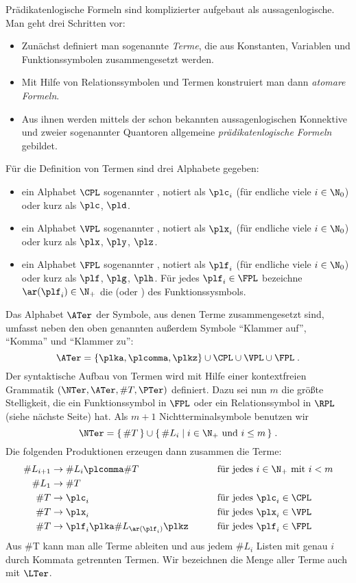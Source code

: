 Prädikatenlogische Formeln sind komplizierter aufgebaut als aussagenlogische.
%
Man geht drei Schritten vor:
%
\begin{itemize}
\item Zunächst definiert man sogenannte \emph{Terme}, die aus
  Konstanten, Variablen und Funktionssymbolen zusammengesetzt werden.
\item Mit Hilfe von Relationssymbolen und Termen konstruiert man dann
  \emph{atomare Formeln}.
\item Aus ihnen werden mittels der schon bekannten aussagenlogischen
  Konnektive und zweier sogenannter Quantoren allgemeine
  \emph{prädikatenlogische Formeln} gebildet.
\end{itemize}
%
Für die Definition von Termen sind drei Alphabete gegeben:
%
\begin{itemize}
\item ein Alphabet $\CPL$ sogenannter
  , notiert als $\plc_i$
  (für endliche viele $i\in\N_0$) oder kurz als $\plc$, $\pld$.
\item ein Alphabet $\VPL$ sogenannter
  , notiert als $\plx_i$
  (für endliche viele $i\in\N_0$) oder kurz als $\plx$, $\ply$, $\plz$.
\item ein Alphabet $\FPL$ sogenannter
  , notiert als $\plf_i$
  (für endliche viele $i\in\N_0$) oder kurz als $\plf$, $\plg$, $\plh$.
  Für jedes $\plf_i\in\FPL$ bezeichne $\ar(\plf_i)\in\N_+$ die
   (oder ) des Funktionssysmbols.
\end{itemize}
%
Das Alphabet $\ATer$ der Symbole, aus denen Terme zusammengesetzt
sind, umfasst neben den oben genannten außerdem Symbole "`Klammer
auf"', "`Komma"' und "`Klammer zu"':
\[
  \ATer = \{ \plka, \plcomma, \plkz \} \cup \CPL \cup \VPL \cup \FPL \;.
\]
%
Der syntaktische Aufbau von Termen wird mit Hilfe einer kontextfreien
Grammatik $(\NTer, \ATer, \#T, \PTer)$ definiert.
%
Dazu sei nun $m$ die größte Stelligkeit, die ein Funktionssymbol in
$\FPL$ oder ein Relationssymbol in $\RPL$ (siehe nächste Seite) hat.
%
Als $m+1$ Nichtterminalsymbole benutzen wir 
\[
  \NTer = \{ \,\#T \,\} \cup \{ \, \#L_i \mid i\in\N_+ \text{ und } i\leq m \,\} \;.
\]
%
Die folgenden Produktionen erzeugen dann zusammen die Terme:
\begin{alignat*}{2}
  \#L_{i+1} &\to \#L_i \plcomma \#T &\qquad& \text{für jedes } i\in\N_+\text{ mit } i<m   \\
  \#L_1  &\to \#T \\
  \#T &\to \plc_i && \text{für jedes } \plc_i\in\CPL\\
  \#T &\to \plx_i && \text{für jedes } \plx_i\in\VPL\\
  \#T &\to \plf_i\plka\#L_{\ar(\plf_i)} \plkz && \text{für jedes } \plf_i\in\FPL
\end{alignat*}
%
Aus \#T kann man alle Terme ableiten und aus jedem $\#L_i$ Listen mit
genau $i$ durch Kommata getrennten Termen. 
%
Wir bezeichnen die Menge aller Terme auch mit $\LTer$.


